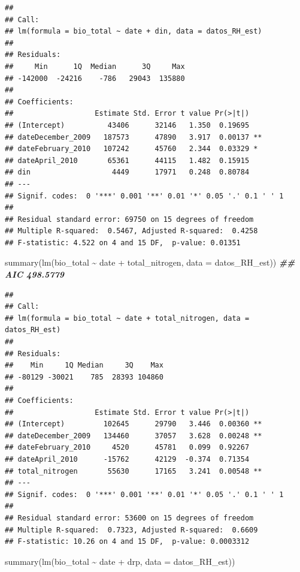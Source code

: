 \documentclass[
]{book}
\newenvironment{Shaded}{\begin{snugshade}}{\end{snugshade}}
\newcommand{\AttributeTok}[1]{\textcolor[rgb]{0.77,0.63,0.00}{#1}}
\newcommand{\DocumentationTok}[1]{\textcolor[rgb]{0.56,0.35,0.01}{\textbf{\textit{#1}}}}
\newcommand{\FunctionTok}[1]{\textcolor[rgb]{0.00,0.00,0.00}{#1}}
\newcommand{\NormalTok}[1]{#1}
\newcommand{\SpecialCharTok}[1]{\textcolor[rgb]{0.00,0.00,0.00}{#1}}
\begin{document}
\begin{verbatim}
## 
## Call:
## lm(formula = bio_total ~ date + din, data = datos_RH_est)
## 
## Residuals:
##     Min      1Q  Median      3Q     Max 
## -142000  -24216    -786   29043  135880 
## 
## Coefficients:
##                   Estimate Std. Error t value Pr(>|t|)   
## (Intercept)          43406      32146   1.350  0.19695   
## dateDecember_2009   187573      47890   3.917  0.00137 **
## dateFebruary_2010   107242      45760   2.344  0.03329 * 
## dateApril_2010       65361      44115   1.482  0.15915   
## din                   4449      17971   0.248  0.80784   
## ---
## Signif. codes:  0 '***' 0.001 '**' 0.01 '*' 0.05 '.' 0.1 ' ' 1
## 
## Residual standard error: 69750 on 15 degrees of freedom
## Multiple R-squared:  0.5467, Adjusted R-squared:  0.4258 
## F-statistic: 4.522 on 4 and 15 DF,  p-value: 0.01351
\end{verbatim}

\begin{Shaded}
\begin{Highlighting}[]
\FunctionTok{summary}\NormalTok{(}\FunctionTok{lm}\NormalTok{(bio\_total }\SpecialCharTok{\textasciitilde{}}\NormalTok{ date }\SpecialCharTok{+}\NormalTok{ total\_nitrogen, }\AttributeTok{data =}\NormalTok{ datos\_RH\_est)) }\DocumentationTok{\#\# AIC 498.5779}
\end{Highlighting}
\end{Shaded}

\begin{verbatim}
## 
## Call:
## lm(formula = bio_total ~ date + total_nitrogen, data = datos_RH_est)
## 
## Residuals:
##    Min     1Q Median     3Q    Max 
## -80129 -30021    785  28393 104860 
## 
## Coefficients:
##                   Estimate Std. Error t value Pr(>|t|)   
## (Intercept)         102645      29790   3.446  0.00360 **
## dateDecember_2009   134460      37057   3.628  0.00248 **
## dateFebruary_2010     4520      45781   0.099  0.92267   
## dateApril_2010      -15762      42129  -0.374  0.71354   
## total_nitrogen       55630      17165   3.241  0.00548 **
## ---
## Signif. codes:  0 '***' 0.001 '**' 0.01 '*' 0.05 '.' 0.1 ' ' 1
## 
## Residual standard error: 53600 on 15 degrees of freedom
## Multiple R-squared:  0.7323, Adjusted R-squared:  0.6609 
## F-statistic: 10.26 on 4 and 15 DF,  p-value: 0.0003312
\end{verbatim}

\begin{Shaded}
\begin{Highlighting}[]
\FunctionTok{summary}\NormalTok{(}\FunctionTok{lm}\NormalTok{(bio\_total }\SpecialCharTok{\textasciitilde{}}\NormalTok{ date }\SpecialCharTok{+}\NormalTok{ drp, }\AttributeTok{data =}\NormalTok{ datos\_RH\_est))}
\end{Highlighting}
\end{Shaded}
\end{document}
